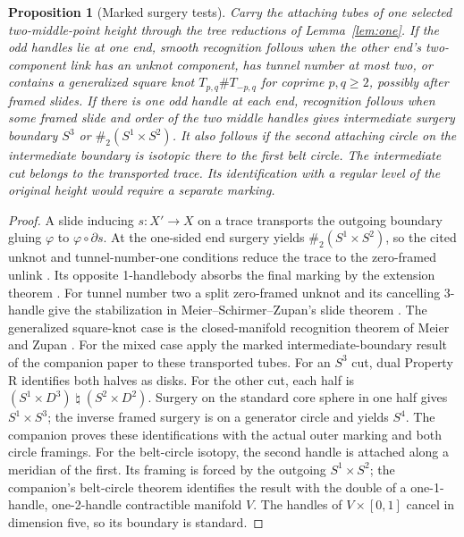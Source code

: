 \documentclass[11pt,letterpaper]{article}
\numberwithin{equation}{section}
\newtheorem{proposition}[theorem]{Proposition}
\begin{document}
\begin{proposition}[Marked surgery tests]\label{prop:two-middle-tests}
Carry the attaching tubes of one selected two-middle-point height
through the tree reductions of Lemma~\ref{lem:one}. If the odd handles lie at
one end, smooth recognition follows when the other end's two-component
link has an unknot component, has tunnel number at most two,
or contains a generalized square knot \(T_{p,q}\#T_{-p,q}\)
for coprime \(p,q\ge2\), possibly after framed slides. If there is one odd handle at each end, recognition
follows when some framed slide and order of the two middle handles
gives intermediate surgery boundary \(S^3\) or \(\#_2(S^1\times S^2)\).
It also follows if the second attaching circle on the intermediate
boundary is isotopic there to the first belt circle.
The intermediate cut belongs to the transported trace. Its identification
with a regular level of the original height would require a separate marking.
\end{proposition}
\begin{proof}
A slide inducing \(s:X'\to X\) on a trace transports the outgoing
boundary gluing \(\varphi\) to \(\varphi\circ\partial s\). At the
one-sided end surgery yields \(\#_2(S^1\times S^2)\), so the cited
unknot and tunnel-number-one conditions reduce the trace to the zero-framed unlink
\cite[Propositions 3.1--3.2]{GompfScharlemannThompson2010}. Its
opposite 1-handlebody absorbs the final marking by the extension
theorem \cite[Theorem A]{LaudenbachPoenaru1972Handlebodies}.
For tunnel number two a
split zero-framed unknot and its cancelling 3-handle give the
stabilization in Meier--Schirmer--Zupan's slide theorem
\cite[Corollary 1.3(2)]{MeierSchirmerZupan2016Trisections}. The
generalized square-knot case is the closed-manifold recognition
theorem of Meier and Zupan \cite[Theorem 1.1]{MeierZupan2022SquareKnots}.
For the mixed case apply the marked intermediate-boundary result of the
companion paper \cite{Baker2026MarkedHeights} to these transported tubes.
For an \(S^3\) cut, dual Property R identifies both halves as disks.
For the other cut, each half is
\((S^1\times D^3)\mathbin{\natural}(S^2\times D^2)\).
Surgery on the standard core sphere in one half gives \(S^1\times S^3\);
the inverse framed surgery is on a generator circle and yields \(S^4\).
The companion proves these identifications with the actual outer marking
and both circle framings. For the belt-circle isotopy, the second
handle is attached along a meridian of the first. Its framing is forced
by the outgoing \(S^1\times S^2\); the companion's belt-circle theorem
identifies the result with the double of a one-1-handle, one-2-handle
contractible manifold \(V\). The handles of \(V\times[0,1]\) cancel
in dimension five, so its boundary is standard.
\end{proof}
\end{document}
